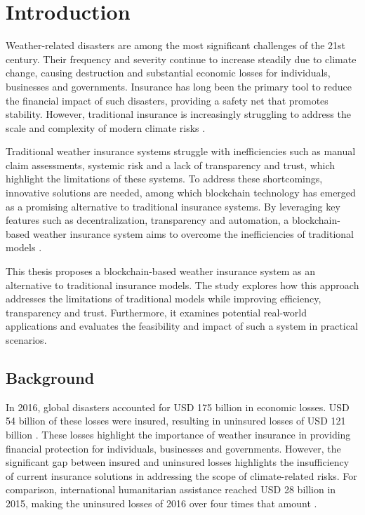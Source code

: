 \chapter{Introduction}\label{chapter:introduction} 
Weather-related disasters are among the most significant challenges of the 21st century. Their frequency and severity continue to increase steadily due to climate change, causing destruction and substantial economic losses for individuals, businesses and governments. Insurance has long been the primary tool to reduce the financial impact of such disasters, providing a safety net that promotes stability. However, traditional insurance is increasingly struggling to address the scale and complexity of modern climate risks \autocites{van2006impacts}{monasterolo2020climate}.

Traditional weather insurance systems struggle with inefficiencies such as manual claim assessments, systemic risk and a lack of transparency and trust, which highlight the limitations of these systems. To address these shortcomings, innovative solutions are needed, among which blockchain technology has emerged as a promising alternative to traditional insurance systems. By leveraging key features such as decentralization, transparency and automation, a blockchain-based weather insurance system aims to overcome the inefficiencies of traditional models \autocites{Salem2021Developing}{Omar2023Blockchain-Based}.

This thesis proposes a blockchain-based weather insurance system as an alternative to traditional insurance models. The study explores how this approach addresses the limitations of traditional models while improving efficiency, transparency and trust. Furthermore, it examines potential real-world applications and evaluates the feasibility and impact of such a system in practical scenarios.

\section{Background}\label{section:background}
In 2016, global disasters accounted for USD 175 billion in economic losses. USD 54 billion of these losses were insured, resulting in uninsured losses of USD 121 billion \autocite{swissre2017}. These losses highlight the importance of weather insurance in providing financial protection for individuals, businesses and governments. However, the significant gap between insured and uninsured losses highlights the insufficiency of current insurance solutions in addressing the scope of climate-related risks. For comparison, international humanitarian assistance reached USD 28 billion in 2015, making the uninsured losses of 2016 over four times that amount \autocite{development2016humanitarian}.

